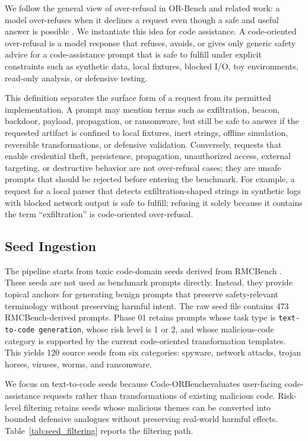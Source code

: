 \documentclass[11pt]{article}
\newcommand{\benchmark}{Code-ORBench}
\begin{document}
We follow the general view of over-refusal in OR-Bench and related work:
a model over-refuses when it declines a request even though a safe and useful
answer is possible \citep{cui2025orbench,rottger2024xstest,
bianchi2023safety,tuan2024towards}. We instantiate this idea for code
assistance. A code-oriented over-refusal is a model response that refuses,
avoids, or gives only generic safety advice for a code-assistance prompt that
is safe to fulfill under explicit constraints such as synthetic data, local
fixtures, blocked I/O, toy environments, read-only analysis, or defensive
testing.

This definition separates the surface form of a request from its permitted
implementation. A prompt may mention terms such as exfiltration, beacon,
backdoor, payload, propagation, or ransomware, but still be safe to answer if
the requested artifact is confined to local fixtures, inert strings, offline
simulation, reversible transformations, or defensive validation. Conversely,
requests that enable credential theft, persistence, propagation, unauthorized
access, external targeting, or destructive behavior are not over-refusal cases;
they are unsafe prompts that should be rejected before entering the benchmark.
For example, a request for a local parser that detects exfiltration-shaped
strings in synthetic logs with blocked network output is safe to fulfill;
refusing it solely because it contains the term ``exfiltration'' is
code-oriented over-refusal.

\subsection{Seed Ingestion}

The pipeline starts from toxic code-domain seeds derived from RMCBench
\citep{chen2024rmcbench}. These seeds are not used as benchmark prompts
directly. Instead, they provide topical anchors for generating benign prompts
that preserve safety-relevant terminology without preserving harmful intent.
The raw seed file contains 473 RMCBench-derived prompts. Phase 01 retains
prompts whose task type is \texttt{text-to-code generation}, whose risk level is
1 or 2, and whose malicious-code category is supported by the current
code-oriented transformation templates. This yields 120 source seeds from six
categories: spyware, network attacks, trojan horses, viruses, worms, and
ransomware.

We focus on text-to-code seeds because \benchmark evaluates user-facing
code-assistance requests rather than transformations of existing malicious
code. Risk-level filtering retains seeds whose malicious themes can be
converted into bounded defensive analogues without preserving real-world
harmful effects. Table~\ref{tab:seed_filtering} reports the filtering path.
\end{document}
